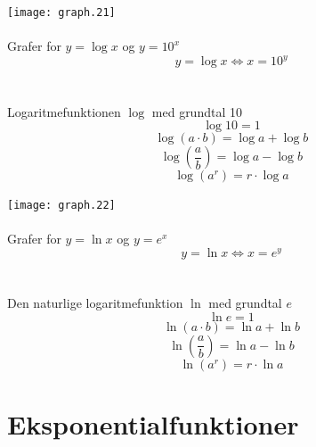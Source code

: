\documentclass[11pt,a5paper,fleqn,leqno]{book}
\begin{document}
\texttt{[image: graph.21]}
\\
\\
Grafer for $y = \log x$ og $y = 10^x$
\begin{equation}
y = \log x \Leftrightarrow x = 10^y
\end{equation}
\\
\\
Logaritmefunktionen $\log$ med grundtal 10
\begin{equation}
\log 10 = 1
\end{equation}
\begin{equation}
\log(a \cdot b) = \log a + \log b
\end{equation}
\begin{equation}
\log\left(\frac{a}{b}\right) = \log a - \log b
\end{equation}
\begin{equation}
\log(a^r) = r \cdot \log a
\end{equation}

\newpage

\texttt{[image: graph.22]}
\\
\\
Grafer for $y = \ln x$ og $y = e^x$
\begin{equation}
y = \ln x \Leftrightarrow x = e^y
\end{equation}
\\
\\
Den naturlige logaritmefunktion $\ln$ med grundtal $e$
\begin{equation}
\ln e = 1
\end{equation}
\begin{equation}
\ln (a \cdot b) = \ln a + \ln b
\end{equation}
\begin{equation}
\ln\left(\frac{a}{b}\right) = \ln a - \ln b
\end{equation}
\begin{equation}
\ln(a^r) = r \cdot \ln a
\end{equation}

\newpage

\section{Eksponentialfunktioner}
\end{document}
